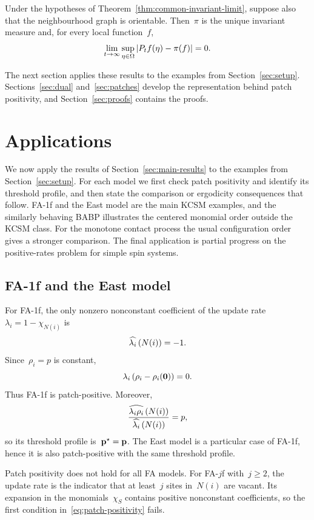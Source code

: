 \documentclass[EJP,preprint,NODS,nobera]{ejpecp}
\begin{document}
\begin{corollary}
\label{cor:oriented-ergodicity}
Under the hypotheses of Theorem~\ref{thm:common-invariant-limit}, suppose also
that the neighbourhood graph is orientable. Then~$\pi$ is the unique invariant
measure and, for every local function~$f$,
\begin{equation*}
\lim_{t\to\infty}
\sup_{\eta\in\Omega}
\left|P_tf(\eta)-\pi(f)\right|
=
0.
\end{equation*}
\end{corollary}

The next section applies these results to the examples from
Section~\ref{sec:setup}. Sections~\ref{sec:dual} and~\ref{sec:patches}
develop the representation behind patch positivity, and
Section~\ref{sec:proofs} contains the proofs.

\section{Applications}
\label{sec:applications}

We now apply the results of Section~\ref{sec:main-results} to the examples from
Section~\ref{sec:setup}. For each model we first check patch positivity and
identify its threshold profile, and then state the comparison or ergodicity
consequences that follow. FA-1f and the East model are the main KCSM examples, and the similarly behaving
BABP illustrates the centered monomial order outside the KCSM class. For the monotone
contact process the usual configuration order gives a stronger comparison. The final application is partial progress on the 
positive-rates problem for simple spin systems.

\subsection{FA-1f and the East model}
\label{subsec:fa-east-applications}

For FA-1f, the only nonzero nonconstant coefficient of the update rate~$\lambda_i=1-\chi_{N(i)}$ is
\begin{equation*}
\widehat{\lambda_i}\left(N(i)\right)=-1.
\end{equation*}
Since~$\rho_i=p$ is constant,
\begin{equation*}
\lambda_i\left(\rho_i-\rho_i(\mathbf{0})\right)=0.
\end{equation*}
Thus FA-1f is patch-positive. Moreover,
\begin{equation*}
\frac{\widehat{\lambda_i\rho_i}\left(N(i)\right)}
{\widehat{\lambda_i}\left(N(i)\right)}
=p,
\end{equation*}
so its threshold profile is~$\mathbf{p}^\star=\mathbf{p}$.
The East model is a particular case of FA-1f, hence it is also patch-positive with the same threshold profile.
\begin{remark}
Patch positivity does not hold for all FA models. For FA-$j$f with~$j\geq2$,
the update rate is the indicator that at least~$j$ sites in~$N(i)$ are vacant.
Its expansion in the monomials~$\chi_S$ contains positive nonconstant
coefficients, so the first condition in~\eqref{eq:patch-positivity} fails.
\end{remark}
\end{document}
